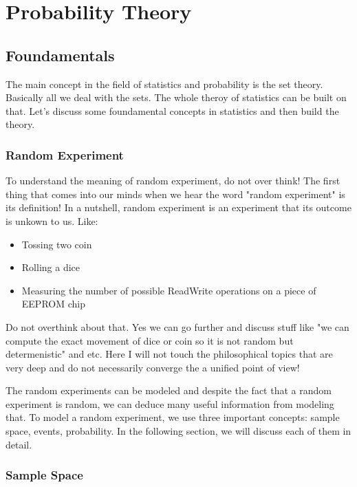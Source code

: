 \chapter{Probability Theory}

\section{Foundamentals}

The main concept in the field of statistics and probability is the set theory. Basically all we deal with the sets. The whole theroy of statistics can be built on that. Let's discuss some foundamental concepts in statistics and then build the theory.

\subsection{Random Experiment}
To understand the meaning of random experiment, do not over think! The first thing that comes into our minds when we hear the word "random experiment" is its definition! In a nutshell, random experiment is an experiment that its outcome is unkown to us. Like:

\begin{itemize}
	\item Tossing two coin
	\item Rolling a dice
	\item Measuring the number of possible ReadWrite operations on a piece of EEPROM chip
\end{itemize}

Do not overthink about that. Yes we can go further and discuss stuff like "we can compute the exact movement of dice or coin so it is not random but determenistic" and etc. Here I will not touch the philosophical topics that are very deep and do not necessarily converge the a unified point of view!

The random experiments can be modeled and despite the fact that a random experiment is random, we can deduce many useful information from modeling that. To model a random experiment, we use three important concepts: sample space, events, probability. In the following section, we will discuss each of them in detail.


\subsection{Sample Space}

